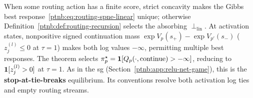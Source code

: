 \begin{remark}[Uniqueness]\label{ptnb:rem:routing-spne-uniqueness}
When some routing action has a finite score, strict concavity makes the Gibbs best
response~\eqref{ptnb:eq:routing-spne-linear} unique; otherwise
Definition~\ref{ptnb:def:routing-recursion} selects the absorbing $\perp_{\mathrm{lin}}$.
At activation states, nonpositive signed continuation mass $\exp V_p(s_+)-\exp V_{p'}(s_-)$
($z_j^{(l)}\leq0$ at $\tau=1$) makes both log values $-\infty$, permitting multiple best responses.
The theorem selects $\pi_p^\star=\mathbf{1}[Q_p(\cdot,\mathrm{continue})>-\infty]$, reducing to
$\mathbf{1}[z_j^{(l)}>0]$ at $\tau=1$. As in the \ac{sg} (Section~\ref{ptnb:app:relu-net-game}), this is
the \textbf{stop-at-tie-breaks} equilibrium. Its conventions resolve both activation log ties and
empty routing streams.
\end{remark}

